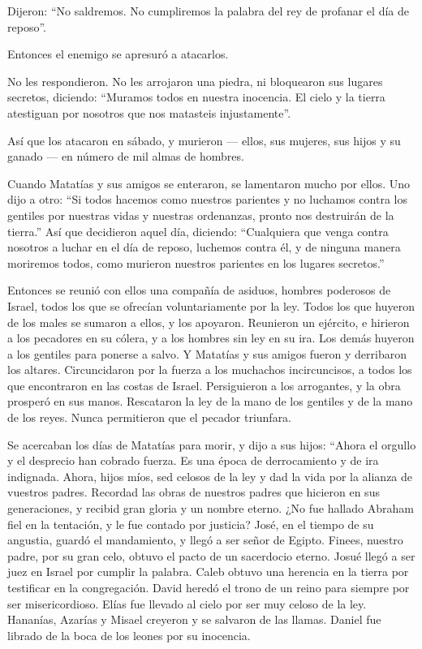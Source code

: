  Dijeron: ``No saldremos. No cumpliremos la palabra del
rey de profanar el día de reposo''.

 Entonces el enemigo se apresuró a atacarlos.

 No les respondieron. No les arrojaron una piedra, ni
bloquearon sus lugares secretos,  diciendo: ``Muramos
todos en nuestra inocencia. El cielo y la tierra atestiguan por nosotros
que nos matasteis injustamente''.

 Así que los atacaron en sábado, y murieron --- ellos,
sus mujeres, sus hijos y su ganado --- en número de mil almas de
hombres.

 Cuando Matatías y sus amigos se enteraron, se lamentaron
mucho por ellos.  Uno dijo a otro: ``Si todos hacemos
como nuestros parientes y no luchamos contra los gentiles por nuestras
vidas y nuestras ordenanzas, pronto nos destruirán de la tierra.''
 Así que decidieron aquel día, diciendo: ``Cualquiera que
venga contra nosotros a luchar en el día de reposo, luchemos contra él,
y de ninguna manera moriremos todos, como murieron nuestros parientes en
los lugares secretos.''

 Entonces se reunió con ellos una compañía de asiduos,
hombres poderosos de Israel, todos los que se ofrecían voluntariamente
por la ley.  Todos los que huyeron de los males se
sumaron a ellos, y los apoyaron.  Reunieron un ejército,
e hirieron a los pecadores en su cólera, y a los hombres sin ley en su
ira. Los demás huyeron a los gentiles para ponerse a salvo.
 Y Matatías y sus amigos fueron y derribaron los altares.
 Circuncidaron por la fuerza a los muchachos
incircuncisos, a todos los que encontraron en las costas de Israel.
 Persiguieron a los arrogantes, y la obra prosperó en sus
manos.  Rescataron la ley de la mano de los gentiles y de
la mano de los reyes. Nunca permitieron que el pecador triunfara.

 Se acercaban los días de Matatías para morir, y dijo a
sus hijos: ``Ahora el orgullo y el desprecio han cobrado fuerza. Es una
época de derrocamiento y de ira indignada.  Ahora, hijos
míos, sed celosos de la ley y dad la vida por la alianza de vuestros
padres.  Recordad las obras de nuestros padres que
hicieron en sus generaciones, y recibid gran gloria y un nombre eterno.
 ¿No fue hallado Abraham fiel en la tentación, y le fue
contado por justicia?  José, en el tiempo de su angustia,
guardó el mandamiento, y llegó a ser señor de Egipto. 
Finees, nuestro padre, por su gran celo, obtuvo el pacto de un
sacerdocio eterno.  Josué llegó a ser juez en Israel por
cumplir la palabra.  Caleb obtuvo una herencia en la
tierra por testificar en la congregación.  David heredó
el trono de un reino para siempre por ser misericordioso.
 Elías fue llevado al cielo por ser muy celoso de la ley.
 Hananías, Azarías y Misael creyeron y se salvaron de las
llamas.  Daniel fue librado de la boca de los leones por
su inocencia.

